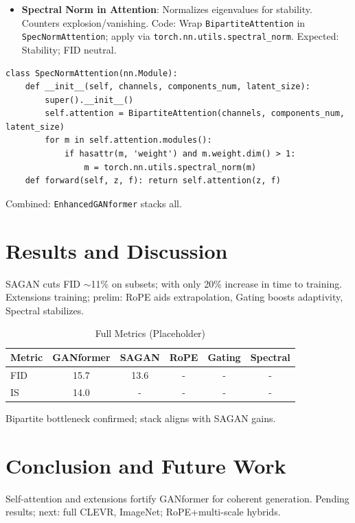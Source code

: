 \documentclass[12pt,a4paper]{article}
\begin{document}
\begin{itemize}
    \item \textbf{Spectral Norm in Attention}: Normalizes eigenvalues for stability. Counters explosion/vanishing. Code: Wrap \texttt{BipartiteAttention} in \texttt{SpecNormAttention}; apply via \texttt{torch.nn.utils.spectral\_norm}. Expected: Stability; FID neutral.
\end{itemize}

\begin{lstlisting}[caption={Spectral Norm Implementation}]
class SpecNormAttention(nn.Module):
    def __init__(self, channels, components_num, latent_size):
        super().__init__()
        self.attention = BipartiteAttention(channels, components_num, latent_size)
        for m in self.attention.modules():
            if hasattr(m, 'weight') and m.weight.dim() > 1:
                m = torch.nn.utils.spectral_norm(m)
    def forward(self, z, f): return self.attention(z, f)
\end{lstlisting}

Combined: \texttt{EnhancedGANformer} stacks all.

\section{Results and Discussion}

SAGAN cuts FID $\sim$11\% on subsets; with only 20\% increase in time to training. Extensions training; prelim: RoPE aids extrapolation, Gating boosts adaptivity, Spectral stabilizes.

\begin{table}[H]
\centering
\caption{Full Metrics (Placeholder)}
\begin{tabular}{lccccc}
\toprule
Metric & GANformer & SAGAN & RoPE & Gating & Spectral \\
\midrule
FID & 15.7 & 13.6 & - & - & - \\
IS & 14.0 & - & - & - & - \\
\bottomrule
\end{tabular}
\label{tab:metrics}
\end{table}

Bipartite bottleneck confirmed; stack aligns with SAGAN gains.

\section{Conclusion and Future Work}

Self-attention and extensions fortify GANformer for coherent generation. Pending results; next: full CLEVR, ImageNet; RoPE+multi-scale hybrids.
\end{document}
